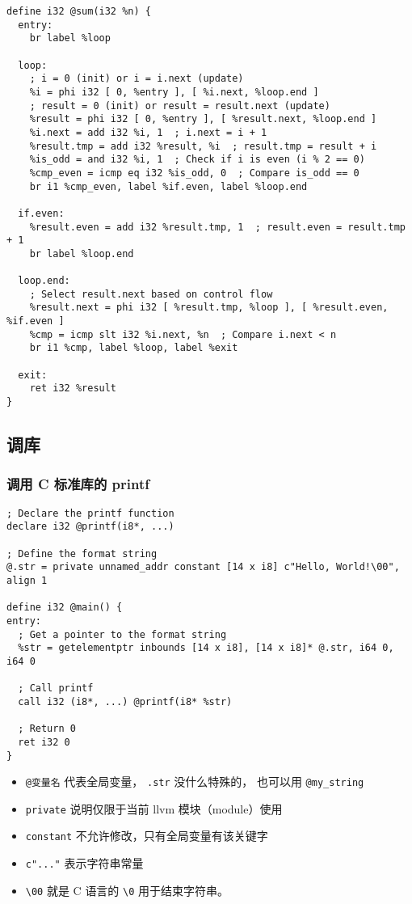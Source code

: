 \begin{lstlisting}[language=none]
define i32 @sum(i32 %n) {
  entry:
    br label %loop

  loop:
    ; i = 0 (init) or i = i.next (update)
    %i = phi i32 [ 0, %entry ], [ %i.next, %loop.end ]
    ; result = 0 (init) or result = result.next (update)
    %result = phi i32 [ 0, %entry ], [ %result.next, %loop.end ]
    %i.next = add i32 %i, 1  ; i.next = i + 1
    %result.tmp = add i32 %result, %i  ; result.tmp = result + i
    %is_odd = and i32 %i, 1  ; Check if i is even (i % 2 == 0)
    %cmp_even = icmp eq i32 %is_odd, 0  ; Compare is_odd == 0
    br i1 %cmp_even, label %if.even, label %loop.end

  if.even:
    %result.even = add i32 %result.tmp, 1  ; result.even = result.tmp + 1
    br label %loop.end

  loop.end:
    ; Select result.next based on control flow
    %result.next = phi i32 [ %result.tmp, %loop ], [ %result.even, %if.even ]
    %cmp = icmp slt i32 %i.next, %n  ; Compare i.next < n
    br i1 %cmp, label %loop, label %exit

  exit:
    ret i32 %result
}
\end{lstlisting}

\subsection{调库}

\subsubsection{调用 C 标准库的 printf}
\begin{lstlisting}[language=none]
; Declare the printf function
declare i32 @printf(i8*, ...)

; Define the format string
@.str = private unnamed_addr constant [14 x i8] c"Hello, World!\00", align 1

define i32 @main() {
entry:
  ; Get a pointer to the format string
  %str = getelementptr inbounds [14 x i8], [14 x i8]* @.str, i64 0, i64 0

  ; Call printf
  call i32 (i8*, ...) @printf(i8* %str)

  ; Return 0
  ret i32 0
}
\end{lstlisting}

\begin{itemize}
\item \verb`@变量名` 代表全局变量， \verb`.str` 没什么特殊的， 也可以用 \verb`@my_string`
\item \verb`private` 说明仅限于当前 llvm 模块（module）使用
\item \verb`constant` 不允许修改，只有全局变量有该关键字
\item \verb`c"..."` 表示字符串常量
\item \verb`\00` 就是 C 语言的 \verb`\0` 用于结束字符串。
\end{itemize}
